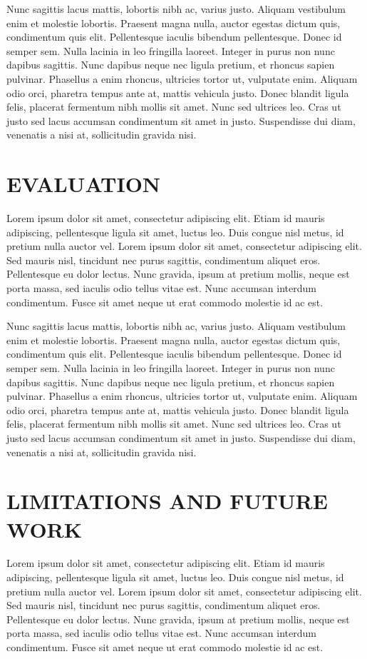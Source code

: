 \documentclass{sig-alternate}
\begin{document}
Nunc sagittis lacus mattis, lobortis nibh ac, varius justo. Aliquam vestibulum enim et molestie lobortis. Praesent magna nulla, auctor
egestas dictum quis, condimentum quis elit. Pellentesque iaculis bibendum pellentesque. Donec id semper sem. Nulla lacinia in leo fringilla 
laoreet. Integer in purus non nunc dapibus sagittis. Nunc dapibus neque nec ligula pretium, et rhoncus sapien pulvinar. Phasellus a enim rhoncus,
 ultricies tortor ut, vulputate enim. Aliquam odio orci, pharetra tempus ante at, mattis vehicula justo. Donec blandit ligula felis, placerat 
 fermentum nibh mollis sit amet. Nunc sed ultrices leo. Cras ut justo sed lacus accumsan condimentum sit amet in justo. Suspendisse dui diam, 
 venenatis a nisi at, sollicitudin gravida nisi.
 

\section {EVALUATION}
\label{sec:evaluation}
Lorem ipsum dolor sit amet, consectetur adipiscing elit. Etiam id mauris adipiscing, pellentesque ligula sit amet, luctus leo. 
Duis congue nisl metus, id pretium nulla auctor vel. Lorem ipsum dolor sit amet, consectetur adipiscing elit. Sed mauris nisl, 
tincidunt nec purus sagittis, condimentum aliquet eros. Pellentesque eu dolor lectus. Nunc gravida, ipsum at pretium mollis, neque 
est porta massa, sed iaculis odio tellus vitae est. Nunc accumsan interdum condimentum. Fusce sit amet neque ut erat commodo molestie id ac est.

Nunc sagittis lacus mattis, lobortis nibh ac, varius justo. Aliquam vestibulum enim et molestie lobortis. Praesent magna nulla, auctor
egestas dictum quis, condimentum quis elit. Pellentesque iaculis bibendum pellentesque. Donec id semper sem. Nulla lacinia in leo fringilla 
laoreet. Integer in purus non nunc dapibus sagittis. Nunc dapibus neque nec ligula pretium, et rhoncus sapien pulvinar. Phasellus a enim rhoncus,
 ultricies tortor ut, vulputate enim. Aliquam odio orci, pharetra tempus ante at, mattis vehicula justo. Donec blandit ligula felis, placerat 
 fermentum nibh mollis sit amet. Nunc sed ultrices leo. Cras ut justo sed lacus accumsan condimentum sit amet in justo. Suspendisse dui diam, 
 venenatis a nisi at, sollicitudin gravida nisi.
 

\section{LIMITATIONS AND FUTURE WORK}
\label{sec:future}
Lorem ipsum dolor sit amet, consectetur adipiscing elit. Etiam id mauris adipiscing, pellentesque ligula sit amet, luctus leo. 
Duis congue nisl metus, id pretium nulla auctor vel. Lorem ipsum dolor sit amet, consectetur adipiscing elit. Sed mauris nisl, 
tincidunt nec purus sagittis, condimentum aliquet eros. Pellentesque eu dolor lectus. Nunc gravida, ipsum at pretium mollis, neque 
est porta massa, sed iaculis odio tellus vitae est. Nunc accumsan interdum condimentum. Fusce sit amet neque ut erat commodo molestie id ac est.
\end{document}

